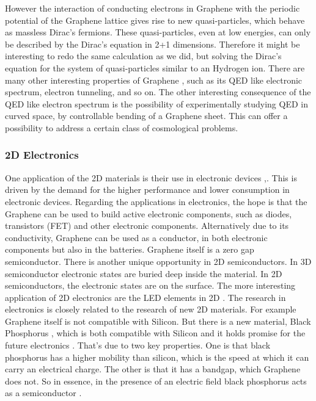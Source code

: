 However the interaction of conducting electrons in Graphene with the periodic potential of the Graphene lattice gives rise to new quasi-particles, which behave as massless Dirac's fermions. These quasi-particles, even at low energies, can only be described by the Dirac's equation in 2+1 dimensions. Therefore it might be interesting to redo the same calculation as we did, but solving the Dirac's equation for the system of quasi-particles similar to an Hydrogen ion.  There are many other interesting properties of Graphene \cite{Graphene0}, such as its QED like electronic spectrum, electron tunneling, and so on. The other interesting consequence of the QED like electron spectrum is the possibility of experimentally studying QED in curved space, by controllable bending of a Graphene sheet. This can offer a possibility to address a certain class of cosmological problems. 

\subsubsection*{2D Electronics}

One application of the 2D materials is their use in electronic devices \cite{2DEJour1},\cite{2DEJour2}. This is driven by the demand for the higher performance and lower consumption in electronic devices.
Regarding the applications in electronics, the hope is that the Graphene can be used to build active electronic components, such as diodes, transistors (FET) and other electronic components. Alternatively due to its conductivity, Graphene can be used as a conductor, in both electronic components but also in the batteries. Graphene itself is a zero gap semiconductor. There is another unique opportunity in 2D semiconductors. In 3D semiconductor electronic states are buried deep inside the material. In 2D semiconductors, the electronic states are on the surface. The more interesting application of 2D electronics are the LED elements in 2D \cite{2DLED}. The research in electronics is closely related to the research of new 2D materials. For example Graphene itself is not compatible with Silicon. But there is a new material, Black Phosphorus \cite{2DPhos}, which is both compatible with Silicon and it holds promise for the future electronics \cite{2DPhos3}. That's due to two key properties. One is that black phosphorus has a higher mobility than silicon, which is the speed at which it can carry an electrical charge. The other is that it has a bandgap, which Graphene does not. So in essence, in the presence of an electric field black phosphorus acts as a semiconductor \cite{2DPhos2}.

